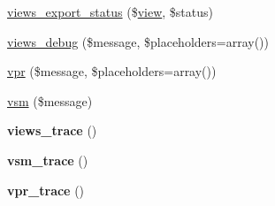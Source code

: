\begin{DoxyCompactItemize}
\hyperlink{views_8module_ad4357e120d4f572aa1f3f12270b9114f}{views\_\-export\_\-status} (\$\hyperlink{classview}{view}, \$status)
\item 
\hyperlink{views_8module_adb6971e0ec522398d8262cc90438e0f9}{views\_\-debug} (\$message, \$placeholders=array())
\item 
\hyperlink{views_8module_aa69e09155c17e0432a42d8e2748164ab}{vpr} (\$message, \$placeholders=array())
\item 
\hyperlink{views_8module_a9f7435f9c80f93858758b82f6f0cc001}{vsm} (\$message)
\item 
\hypertarget{views_8module_a71d9d255aba3d13cd853c5c989736028}{
{\bfseries views\_\-trace} ()}
\label{views_8module_a71d9d255aba3d13cd853c5c989736028}

\item 
\hypertarget{views_8module_a3ea2514fcb3a0e4f24270fd01c7e98cf}{
{\bfseries vsm\_\-trace} ()}
\label{views_8module_a3ea2514fcb3a0e4f24270fd01c7e98cf}

\item 
\hypertarget{views_8module_a8d068e8fce2e3293dbcf408c50bb76ab}{
{\bfseries vpr\_\-trace} ()}
\label{views_8module_a8d068e8fce2e3293dbcf408c50bb76ab}


\end{DoxyCompactItemize}

